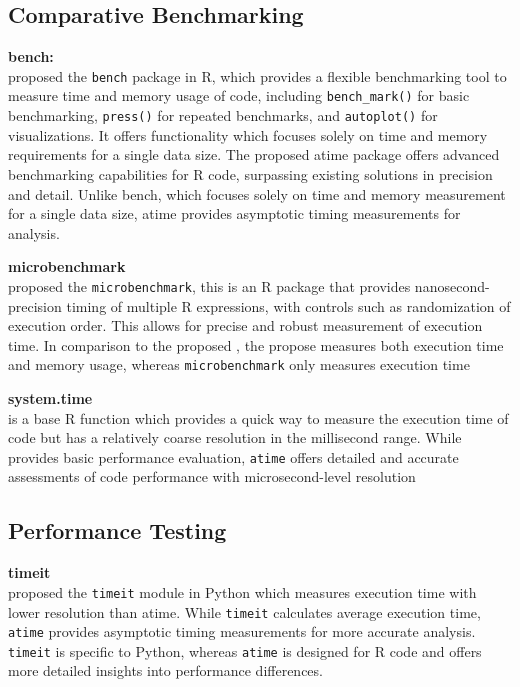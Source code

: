 \subsection{Comparative Benchmarking}

\textbf{bench:} \\
\citet{bench} proposed the \texttt{bench} package in R, which provides a flexible benchmarking tool to measure time and memory usage of code, including \texttt{bench\_mark()} for basic benchmarking, \texttt{press()} for repeated benchmarks, and \texttt{autoplot()} for visualizations. It offers functionality which focuses solely on time and memory requirements for a single data size. The proposed atime package offers advanced benchmarking capabilities for R code, surpassing existing solutions in precision and detail. Unlike bench, which focuses solely on time and memory measurement for a single data size, atime provides asymptotic timing measurements for analysis.
\vspace{0.1in}

\textbf{microbenchmark} \\
\citet{microbenchmark} proposed the \texttt{microbenchmark}, this is an R package that provides nanosecond-precision timing of multiple R expressions, with controls such as randomization of execution order. This allows for precise and robust measurement of execution time. In comparison to the proposed , the propose measures both execution time and memory usage, whereas \texttt{microbenchmark} only measures execution time 
\vspace{0.1in}

\textbf{system.time} \\
\citet{system.time} is a base R function which provides a quick way to measure the execution time of code but has a relatively coarse resolution in the millisecond range.  While \citet{system.time} provides basic performance evaluation, \texttt{atime} offers detailed and accurate assessments of code performance with microsecond-level resolution
\vspace{0.1in}


\subsection{Performance Testing}
\textbf{timeit} \\
\citet{timeit} proposed the \texttt{timeit} module in Python which measures execution time with lower resolution than atime. While \texttt{timeit} calculates average execution time, \texttt{atime} provides asymptotic timing measurements for more accurate analysis. \texttt{timeit} is specific to Python, whereas \texttt{atime} is designed for R code and offers more detailed insights into performance differences.
\vspace{0.1in}

